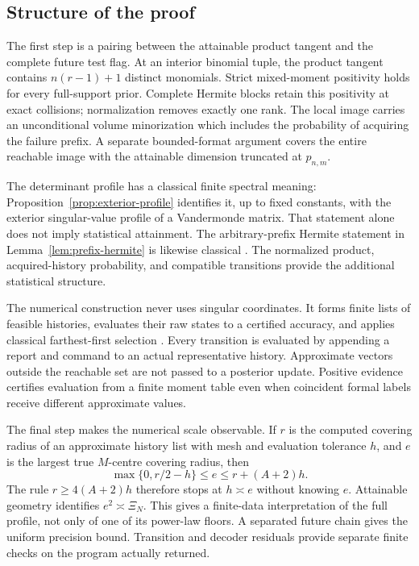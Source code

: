 \subsection{Structure of the proof}
The first step is a pairing between the attainable product tangent and
the complete future test flag. At an interior binomial tuple, the product
tangent contains $n(r-1)+1$ distinct monomials. Strict mixed-moment
positivity holds for every full-support prior. Complete Hermite blocks
retain this positivity at exact collisions; normalization removes exactly
one rank. The local image carries an unconditional volume minorization
which includes the probability of acquiring the failure prefix. A
separate bounded-format argument covers the entire reachable image with
the attainable dimension truncated at $p_{n,m}$.

The determinant profile has a classical finite spectral meaning:
Proposition~\ref{prop:exterior-profile} identifies it, up to fixed
constants, with the exterior singular-value profile of a Vandermonde
matrix. That statement alone does not imply statistical attainment.
The arbitrary-prefix Hermite statement in
Lemma~\ref{lem:prefix-hermite} is likewise classical
\cite[Proposition 7]{deBoor}. The normalized product, acquired-history
probability, and compatible transitions provide the additional
statistical structure.

The numerical construction never uses singular coordinates. It forms
finite lists of feasible histories, evaluates their raw states to a
certified accuracy, and applies classical farthest-first selection
\cite{Gonzalez}. Every transition is evaluated by appending a report and
command to an actual representative history. Approximate vectors outside
the reachable set are not passed to a posterior update. Positive evidence
certifies evaluation from a finite moment table even when coincident
formal labels receive different approximate values.

The final step makes the numerical scale observable. If $r$ is the
computed covering radius of an approximate history list with mesh and
evaluation tolerance $h$, and $e$ is the largest true $M$-centre covering
radius, then
\[
 \max\{0,r/2-h\}\le e\le r+(A+2)h.
\]
The rule $r\ge4(A+2)h$ therefore stops at $h\asymp e$ without knowing
$e$. Attainable geometry identifies $e^2\asymp\Xi_N$. This gives a
finite-data interpretation of the full profile, not only of one of its
power-law floors. A separated future chain gives the uniform precision
bound. Transition and decoder residuals provide separate finite checks
on the program actually returned.

